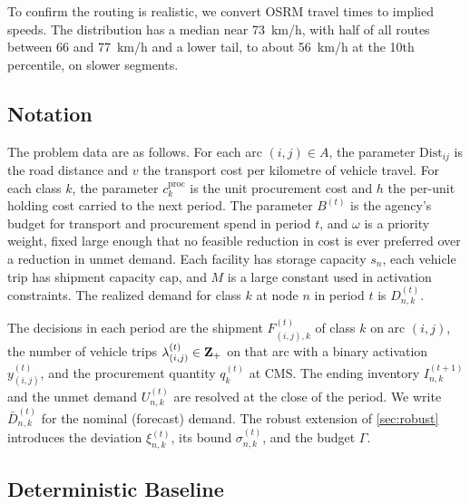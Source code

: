\documentclass[11pt]{article}
\begin{document}
To confirm the routing is realistic, we convert OSRM travel times to implied speeds.
The distribution has a median near 73~km/h, with half of all routes between 66 and 77~km/h and a lower tail, to about 56~km/h at the 10th percentile, on slower segments.

\subsection{Notation}
\label{sec:notation}

The problem data are as follows.
For each arc $(i,j) \in A$, the parameter $\text{Dist}_{ij}$ is the road distance and $v$ the transport cost per kilometre of vehicle travel.
For each class $k$, the parameter $c_k^{\text{proc}}$ is the unit procurement cost and $h$ the per-unit holding cost carried to the next period.
The parameter $B^{(t)}$ is the agency's budget for transport and procurement spend in period $t$, and $\omega$ is a priority weight, fixed large enough that no feasible reduction in cost is ever preferred over a reduction in unmet demand.
Each facility has storage capacity $s_n$, each vehicle trip has shipment capacity $\text{cap}$, and $M$ is a large constant used in activation constraints.
The realized demand for class $k$ at node $n$ in period $t$ is $D_{n,k}^{(t)}$.

The decisions in each period are the shipment $F_{(i,j),k}^{(t)}$ of class $k$ on arc $(i,j)$, the number of vehicle trips $\lambda_{(i,j)}^{(t)} \in {\mathbf Z}_+$ on that arc with a binary activation $y_{(i,j)}^{(t)}$, and the procurement quantity $q_k^{(t)}$ at CMS.
The ending inventory $I_{n,k}^{(t+1)}$ and the unmet demand $U_{n,k}^{(t)}$ are resolved at the close of the period.
We write $\bar D_{n,k}^{(t)}$ for the nominal (forecast) demand.
The robust extension of \Sec\ref{sec:robust} introduces the deviation $\xi_{n,k}^{(t)}$, its bound $\sigma_{n,k}^{(t)}$, and the budget $\Gamma$.

\subsection{Deterministic Baseline}
\label{sec:baseline}
\end{document}
